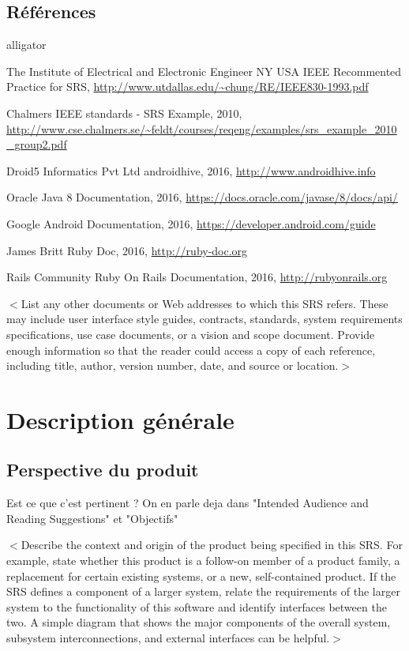 \documentclass[titlepage, 12pt]{report}
\begin{document}
\section{Références}
\begin{labeling}{alligator}
	\item [The Institute of Electrical and Electronic Engineer NY USA] IEEE Recommented Practice for SRS, \url{http://www.utdallas.edu/~chung/RE/IEEE830-1993.pdf}
	\item [Chalmers] IEEE standards - SRS Example, 2010, \url{http://www.cse.chalmers.se/~feldt/courses/reqeng/examples/srs_example_2010_group2.pdf}
	\item [Droid5 Informatics Pvt Ltd] androidhive, 2016, \url{http://www.androidhive.info}
	\item [Oracle] Java 8 Documentation, 2016, \url{https://docs.oracle.com/javase/8/docs/api/}
	\item [Google] Android Documentation, 2016, \url{https://developer.android.com/guide}
	\item [James Britt] Ruby Doc, 2016, \url{http://ruby-doc.org}
	\item [Rails Community] Ruby On Rails Documentation, 2016, \url{http://rubyonrails.org}
\end{labeling}

$<$List any other documents or Web addresses to which this SRS refers. These may 
include user interface style guides, contracts, standards, system requirements 
specifications, use case documents, or a vision and scope document. Provide 
enough information so that the reader could access a copy of each reference, 
including title, author, version number, date, and source or location.$>$


\chapter{Description générale}

\section{Perspective du produit}

Est ce que c'est pertinent ? On en parle deja dans "Intended Audience and Reading Suggestions" et "Objectifs"

$<$Describe the context and origin of the product being specified in this SRS.  
For example, state whether this product is a follow-on member of a product 
family, a replacement for certain existing systems, or a new, self-contained 
product. If the SRS defines a component of a larger system, relate the 
requirements of the larger system to the functionality of this software and 
identify interfaces between the two. A simple diagram that shows the major 
components of the overall system, subsystem interconnections, and external 
interfaces can be helpful.$>$
\end{document}
